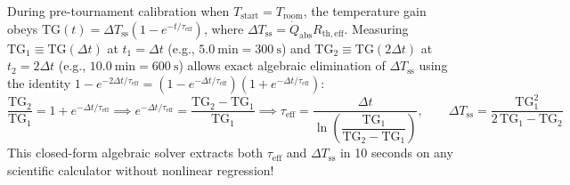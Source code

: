 \begin{derivation}
During pre-tournament calibration when $T_{\mathrm{start}} = T_{\mathrm{room}}$, the temperature gain obeys $\mathrm{TG}(t) = \Delta T_{\mathrm{ss}}(1 - e^{-t/\tau_{\mathrm{eff}}})$, where $\Delta T_{\mathrm{ss}} = \dot{Q}_{\mathrm{abs}}R_{\mathrm{th,eff}}$. Measuring $\mathrm{TG}_1 \equiv \mathrm{TG}(\Delta t)$ at $t_1 = \Delta t$ (e.g., $\SI{5.0}{\minute} = \SI{300}{\second}$) and $\mathrm{TG}_2 \equiv \mathrm{TG}(2\Delta t)$ at $t_2 = 2\Delta t$ (e.g., $\SI{10.0}{\minute} = \SI{600}{\second}$) allows exact algebraic elimination of $\Delta T_{\mathrm{ss}}$ using the identity $1 - e^{-2\Delta t/\tau_{\mathrm{eff}}} = (1 - e^{-\Delta t/\tau_{\mathrm{eff}}})(1 + e^{-\Delta t/\tau_{\mathrm{eff}}})$:
\[
  \frac{\mathrm{TG}_2}{\mathrm{TG}_1} = 1 + e^{-\Delta t/\tau_{\mathrm{eff}}} \implies e^{-\Delta t/\tau_{\mathrm{eff}}} = \frac{\mathrm{TG}_2 - \mathrm{TG}_1}{\mathrm{TG}_1} \implies
  \boxed{\tau_{\mathrm{eff}} = \frac{\Delta t}{\ln\!\left(\dfrac{\mathrm{TG}_1}{\mathrm{TG}_2 - \mathrm{TG}_1}\right)}, \qquad \Delta T_{\mathrm{ss}} = \frac{\mathrm{TG}_1^2}{2\,\mathrm{TG}_1 - \mathrm{TG}_2}}
\]
This closed-form algebraic solver extracts both $\tau_{\mathrm{eff}}$ and $\Delta T_{\mathrm{ss}}$ in 10 seconds on any scientific calculator without nonlinear regression!
\end{derivation}

